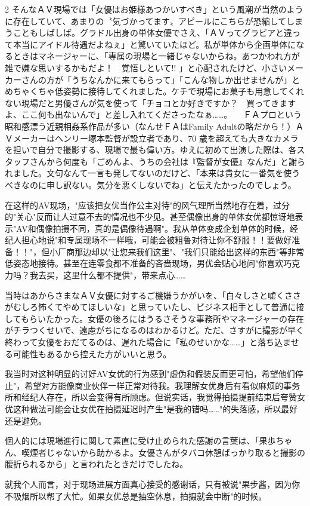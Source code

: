 \documentclass[12pt,UTF8]{ctexbook}
\begin{document}
\begin{paracol}{2}
そんなＡＶ現場では「女優はお姫様あつかいすべき」という風潮が当然のように存在していて、あまりの〝気づかってます〟アピールにこちらが恐縮してしまうこともしばしば。グラドル出身の単体女優でさえ、「ＡＶってグラビアと違って本当にアイドル待遇だよねぇ」と驚いていたほど。私が単体から企画単体になるときはマネージャーに、「専属の現場と一緒じゃないからね。あつかわれ方が雑で嫌な思いするかもだよ！　覚悟しといて!!
 」と心配されたけど、小さいメーカーさんの方が「うちなんかに来てもらって」「こんな物しか出せませんが」とめちゃくちゃ低姿勢に接待してくれました。ケチで現場にお菓子も用意してくれない現場だと男優さんが気を使って「チョコとか好きですか？　買ってきますよ、ここ何も出ないんで」と差し入れてくださったなぁ……。
　ＦＡプロという昭和感漂う近親相姦系作品が多い（なんせＦＡはFamily Adultの略だから！）ＡＶメーカーはヘンリー塚本監督が設立者であり、70
 歳を超えても大きなカメラを担いで自分で撮影する、現場で最も偉い方。ゆえに初めて出演した際は、各スタッフさんから何度も「ごめんよ、うちの会社は『監督が女優』なんだ」と謝られました。文句なんて一言も発してないのだけど、「本来は貴女に一番気を使うべきなのに申し訳ない。気分を悪くしないでね」と伝えたかったのでしょう。

\switchcolumn

在这样的AV现场，"应该把女优当作公主对待"的风气理所当然地存在着，过分的"关心"反而让人过意不去的情况也不少见。甚至偶像出身的单体女优都惊讶地表示"AV和偶像拍摄不同，真的是偶像待遇啊"。我从单体变成企划单体的时候，经纪人担心地说"和专属现场不一样哦，可能会被粗鲁对待让你不舒服！！要做好准备！！"，但小厂商那边却以"让您来我们这里"、"我们只能给出这样的东西"等非常低姿态地接待。甚至在连零食都不准备的吝啬现场，男优会贴心地问"你喜欢巧克力吗？我去买，这里什么都不提供"，带来点心……

\switchcolumn*

当時はあからさまなＡＶ女優に対するご機嫌うかがいを、「白々しさと嘘くささがむしろ怖くてやめてほしいな」と思っていたし、ビジネス相手として普通に接してもらいたかった。女優の後ろにはうるさそうな事務所やマネージャーの存在がチラつくせいで、遠慮がちになるのはわかるけど。ただ、さすがに撮影が早く終わって女優をおだてるのは、遅れた場合に「私のせいかな……」と落ち込ませる可能性もあるから控えた方がいいと思う。

\switchcolumn

我当时对这种明显的讨好AV女优的行为感到"虚伪和假装反而更可怕，希望他们停止"，希望对方能像商业伙伴一样正常对待我。我理解女优身后有看似麻烦的事务所和经纪人存在，所以会变得有所顾虑。但说实话，我觉得拍摄提前结束后夸赞女优这种做法可能会让女优在拍摄延迟时产生"是我的错吗……"的失落感，所以最好还是避免。

\switchcolumn*

個人的には現場進行に関して素直に受け止められた感謝の言葉は、「果歩ちゃん、喫煙者じゃないから助かるよ。女優さんがタバコ休憩ばっかり取ると撮影の腰折られるから」と言われたときだけでしたね。

\switchcolumn

就我个人而言，对于现场进展方面真心接受的感谢话，只有被说"果步酱，因为你不吸烟所以帮了大忙。如果女优总是抽空休息，拍摄就会中断"的时候。

\end{paracol}
\end{document}
